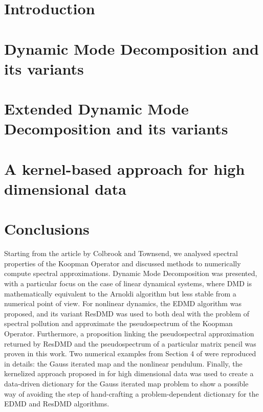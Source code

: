 \documentclass[10pt, a4paper]{report}
\begin{document}
\chapter{Introduction}


\chapter{Dynamic Mode Decomposition and its variants}


\chapter{Extended Dynamic Mode Decomposition and its variants}


\chapter{A kernel-based approach for high dimensional data}


\chapter{Conclusions}
Starting from the article \cite{colbrook_rigorous_2021} by Colbrook and Townsend, we analysed spectral properties of the Koopman Operator and discussed methods to numerically compute spectral approximations. Dynamic Mode Decomposition was presented, with a particular focus on the case of linear dynamical systems, where DMD is mathematically equivalent to the Arnoldi algorithm but less stable from a numerical point of view. For nonlinear dynamics, the EDMD algorithm was proposed, and its variant ResDMD was used to both deal with the problem of spectral pollution and approximate the pseudospectrum of the Koopman Operator. Furthermore, a proposition linking the pseudospectral approximation returned by ResDMD and the pseudospectrum of a particular matrix pencil was proven in this work. Two numerical examples from Section 4 of \cite{colbrook_rigorous_2021} were reproduced in details: the Gauss iterated map and the nonlinear pendulum. Finally, the kernelized approach proposed in \cite{colbrook_rigorous_2021} for high dimensional data was used to create a data-driven dictionary for the Gauss iterated map problem to show a possible way of avoiding the step of hand-crafting a problem-dependent dictionary for the EDMD and ResDMD algorithms.

\nocite{*}
\printbibliography
\end{document}
